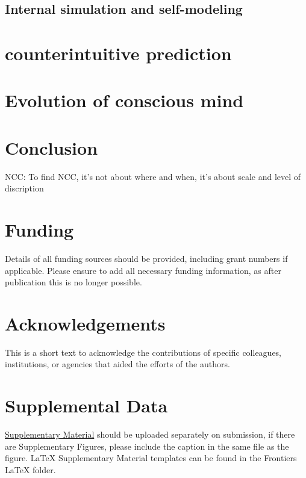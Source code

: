 \documentclass[utf8]{frontiersSCNS}
\begin{document}
	\subsection{Internal simulation and self-modeling}

\section{counterintuitive prediction}

\section{Evolution of conscious mind}
	\cite{dennett2008kinds}

\section{Conclusion}
	NCC: To find NCC, it's not about where and when, it's about scale and level of discription



\section*{Funding}
Details of all funding sources should be provided, including grant numbers if applicable. Please ensure to add all necessary funding information, as after publication this is no longer possible.

\section*{Acknowledgements}
This is a short text to acknowledge the contributions of specific colleagues, institutions, or agencies that aided the efforts of the authors.

\section*{Supplemental Data}
 \href{http://home.frontiersin.org/about/author-guidelines#SupplementaryMaterial}{Supplementary Material} should be uploaded separately on submission, if there are Supplementary Figures, please include the caption in the same file as the figure. LaTeX Supplementary Material templates can be found in the Frontiers LaTeX folder.
\end{document}
